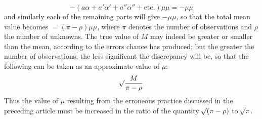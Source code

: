 \[
-(a\alpha+a'\alpha'+a''\alpha''+\text{etc.})\mu\mu=-\mu\mu
\]
%
and similarly each of the remaining parts will give \(-\mu\mu\), so that the total mean value becomes \(=(\pi-\rho)\mu\mu\), where \(\pi\) denotes the number of observations and \(\rho\) the number of unknowns. The true value of \(M\) may indeed be greater or smaller than the mean, according to the errors chance has produced; but the greater the number of observations, the less significant the discrepancy will be, so that the following can be taken as an approximate value of \(\mu\):
\[
\mathord{{}^{}\!\surd}\frac{M}{\pi-\rho}
\]
Thus the value of \(\mu\) resulting from the erroneous practice discussed in the preceding article must be increased in the ratio of the quantity \(\mathord{{}^{}\!\surd}(\pi-\rho)\) to \(\mathord{{}^{}\!\surd}\pi\).

\clearpage
